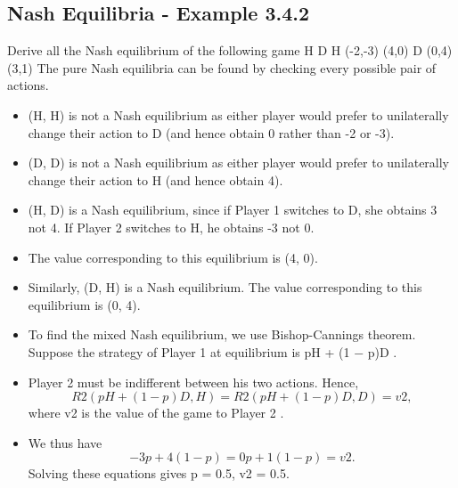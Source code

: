 \documentclass[]{article}
\begin{document}
	\subsection{Nash Equilibria - Example 3.4.2}
	Derive all the Nash equilibrium of the following game
	H D
	H (-2,-3) (4,0)
	D (0,4) (3,1)
	The pure Nash equilibria can be found by checking every possible
	pair of actions.
	\begin{itemize}
		\item (H, H) is not a Nash equilibrium as either player would prefer to
		unilaterally change their action to D (and hence obtain 0 rather
		than -2 or -3).
		\item (D, D) is not a Nash equilibrium as either player would prefer to
		unilaterally change their action to H (and hence obtain 4).
		\item (H, D) is a Nash equilibrium, since if Player 1 switches to D, she
		obtains 3 not 4. If Player 2 switches to H, he obtains -3 not 0.
		\item	The value corresponding to this equilibrium is (4, 0).
		\item	Similarly, (D, H) is a Nash equilibrium. The value corresponding to
		this equilibrium is (0, 4).
	\end{itemize}
	
	\begin{itemize}
		\item To find the mixed Nash equilibrium, we use Bishop-Cannings
		theorem. Suppose the strategy of Player 1 at equilibrium is
		pH + (1 − p)D . 	\item Player 2 must be indifferent between his two
		actions. Hence,
		\[R2(pH + (1 − p)D, H) = R2(pH + (1 − p)D, D) = v2,\]
		where v2 is the value of the game to Player 2 .
		\item We thus have \[−3p + 4(1 − p) = 0p + 1(1 − p) = v2.\] Solving these
		equations gives p = 0.5, v2 = 0.5.
	\end{itemize}
	
\end{document}
